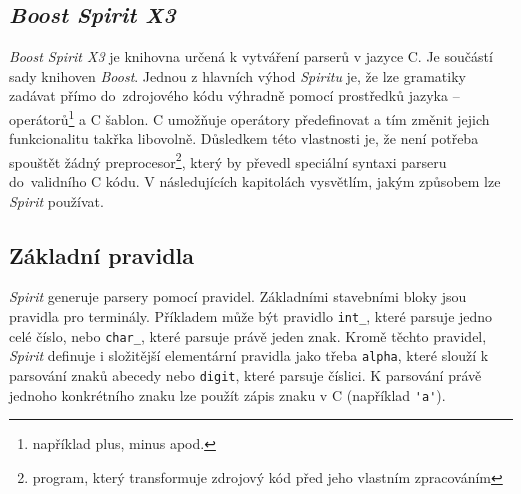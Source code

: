 \documentclass[thesis=B,czech,hidelinks]{FITthesis}[2019/03/06]
\newcommand{\Rplus}{\protect\hspace{-.1em}\protect\raisebox{.35ex}{\smaller{\smaller\textbf{+}}}}
\newcommand{\Cpp}{\mbox{C\Rplus\Rplus}\xspace}
\begin{document}
\subsection{\textit{Boost Spirit X3}}
\textit{Boost Spirit X3} je knihovna určená k vytváření parserů v jazyce \Cpp{}. Je součástí sady knihoven \textit{Boost}. Jednou z hlavních výhod \textit{Spiritu} je, že lze gramatiky zadávat přímo do~zdrojového kódu výhradně pomocí prostředků jazyka -- operátorů\footnote{například plus, minus apod.} a \Cpp{} šablon. \Cpp{} umožňuje operátory předefinovat a tím změnit jejich funkcionalitu takřka libovolně. Důsledkem této vlastnosti je, že není potřeba spouštět žádný preprocesor\footnote{program, který transformuje zdrojový kód před jeho vlastním zpracováním}, který by převedl speciální syntaxi parseru do~validního \Cpp{} kódu. V následujících kapitolách vysvětlím, jakým způsobem lze \textit{Spirit} používat.

\subsection{Základní pravidla}
\textit{Spirit} generuje parsery pomocí pravidel. Základními stavebními bloky jsou pravidla pro terminály. Příkladem může být pravidlo \verb¨int_¨, které parsuje jedno celé číslo, nebo \verb¨char_¨, které parsuje právě jeden znak. Kromě těchto pravidel, \textit{Spirit} definuje i složitější elementární pravidla jako třeba \texttt{alpha}, které slouží k parsování znaků abecedy nebo \texttt{digit}, které parsuje číslici. K parsování právě jednoho konkrétního znaku lze použít zápis znaku v \Cpp{} (například \verb¨'a'¨).
\end{document}
